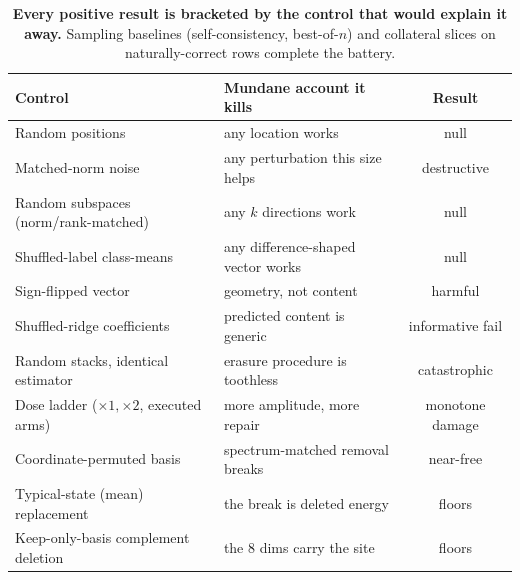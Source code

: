 \documentclass{article} %
\begin{document}
\begin{table}[t]
\centering
\small
\begin{tabular}{llc}
\toprule
\textbf{Control} & \textbf{Mundane account it kills} & \textbf{Result} \\
\midrule
Random positions & any location works & null \\
Matched-norm noise & any perturbation this size helps & destructive \\
Random subspaces (norm/rank-matched) & any $k$ directions work & null \\
Shuffled-label class-means & any difference-shaped vector works & null \\
Sign-flipped vector & geometry, not content & harmful \\
Shuffled-ridge coefficients & predicted content is generic & informative fail \\
Random stacks, identical estimator & erasure procedure is toothless & catastrophic \\
Dose ladder ($\times1,\times2$, executed arms) & more amplitude, more repair & monotone damage \\
Coordinate-permuted basis & spectrum-matched removal breaks & near-free \\
Typical-state (mean) replacement & the break is deleted energy & floors \\
Keep-only-basis complement deletion & the $8$ dims carry the site & floors \\
\bottomrule
\end{tabular}
\caption{\textbf{Every positive result is bracketed by the control
that would explain it away.} Sampling baselines (self-consistency,
best-of-$n$) and collateral slices on naturally-correct rows complete
the battery.}
\label{tab:controls}
\end{table}
\end{document}
